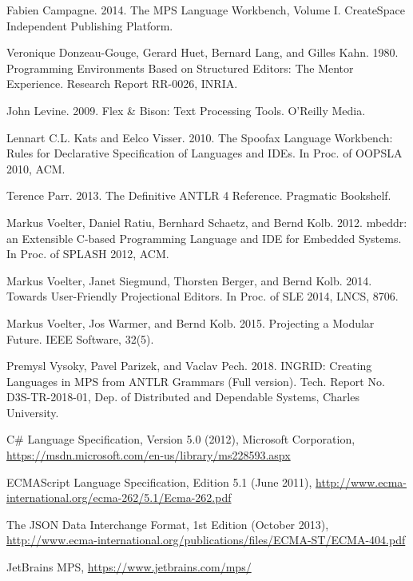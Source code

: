 \documentclass[sigconf]{acmart}
\begin{document}
\begin{thebibliography}{}

 Fabien Campagne. 2014. The MPS Language Workbench, Volume I. CreateSpace Independent Publishing Platform.

 Veronique Donzeau-Gouge, Gerard Huet, Bernard Lang, and Gilles Kahn. 1980. Programming Environments Based on Structured Editors: The Mentor Experience. Research Report RR-0026, INRIA.

 John Levine. 2009. Flex \& Bison: Text Processing Tools. O'Reilly Media.

 Lennart C.L. Kats and Eelco Visser. 2010. The Spoofax Language Workbench: Rules for Declarative Specification of Languages and IDEs. In Proc. of OOPSLA 2010, ACM.

 Terence Parr. 2013. The Definitive ANTLR 4 Reference. Pragmatic Bookshelf.

 Markus Voelter, Daniel Ratiu, Bernhard Schaetz, and Bernd Kolb. 2012. mbeddr: an Extensible C-based Programming Language and IDE for Embedded Systems. In Proc. of SPLASH 2012, ACM.

 Markus Voelter, Janet Siegmund, Thorsten Berger, and Bernd Kolb. 2014. Towards User-Friendly Projectional Editors. In Proc. of SLE 2014, LNCS, 8706.

 Markus Voelter, Jos Warmer, and Bernd Kolb. 2015. Projecting a Modular Future. IEEE Software, 32(5).

 Premysl Vysoky, Pavel Parizek, and Vaclav Pech. 2018. INGRID: Creating Languages in MPS from ANTLR Grammars (Full version). Tech. Report No. D3S-TR-2018-01, Dep. of Distributed and Dependable Systems, Charles University.

 C\# Language Specification, Version 5.0 (2012), Microsoft Corporation, \url{https://msdn.microsoft.com/en-us/library/ms228593.aspx}

 ECMAScript Language Specification, Edition 5.1 (June 2011), \url{http://www.ecma-international.org/ecma-262/5.1/Ecma-262.pdf}

 The JSON Data Interchange Format, 1st Edition (October 2013), \url{http://www.ecma-international.org/publications/files/ECMA-ST/ECMA-404.pdf}

 JetBrains MPS, \url{https://www.jetbrains.com/mps/}


\end{thebibliography}
\end{document}
